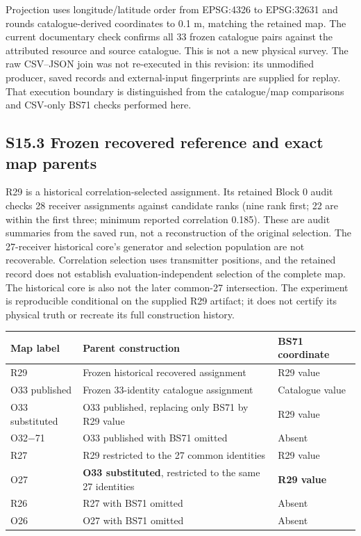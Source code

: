\documentclass[journal,onecolumn,10pt]{IEEEtran}
\begin{document}
Projection uses longitude/latitude order from EPSG:4326 to EPSG:32631 and rounds catalogue-derived coordinates to 0.1 m, matching the retained map. The current documentary check confirms all 33 frozen catalogue pairs against the attributed resource and source catalogue. This is not a new physical survey. The raw CSV--JSON join was not re-executed in this revision: its unmodified producer, saved records and external-input fingerprints are supplied for replay. That execution boundary is distinguished from the catalogue/map comparisons and CSV-only BS71 checks performed here.

\subsection*{S15.3 Frozen recovered reference and exact map parents}
R29 is a historical correlation-selected assignment. Its retained Block 0 audit checks 28 receiver assignments against candidate ranks (nine rank first; 22 are within the first three; minimum reported correlation 0.185). These are audit summaries from the saved run, not a reconstruction of the original selection. The 27-receiver historical core's generator and selection population are not recoverable. Correlation selection uses transmitter positions, and the retained record does not establish evaluation-independent selection of the complete map. The historical core is also not the later common-27 intersection. The experiment is reproducible conditional on the supplied R29 artifact; it does not certify its physical truth or recreate its full construction history.

\begin{center}\begin{minipage}{\textwidth}\centering
{}\label{tab:s-map-parents}
\begin{tabularx}{\textwidth}{@{}lXl@{}}
\toprule
Map label & Parent construction & BS71 coordinate \\
\midrule
R29 & Frozen historical recovered assignment & R29 value \\
O33 published & Frozen 33-identity catalogue assignment & Catalogue value \\
O33 substituted & O33 published, replacing only BS71 by R29 value & R29 value \\
O32$-$71 & O33 published with BS71 omitted & Absent \\
R27 & R29 restricted to the 27 common identities & R29 value \\
O27 & \textbf{O33 substituted}, restricted to the same 27 identities & \textbf{R29 value} \\
R26 & R27 with BS71 omitted & Absent \\
O26 & O27 with BS71 omitted & Absent \\
\bottomrule
\end{tabularx}
\end{minipage}\end{center}
\end{document}

